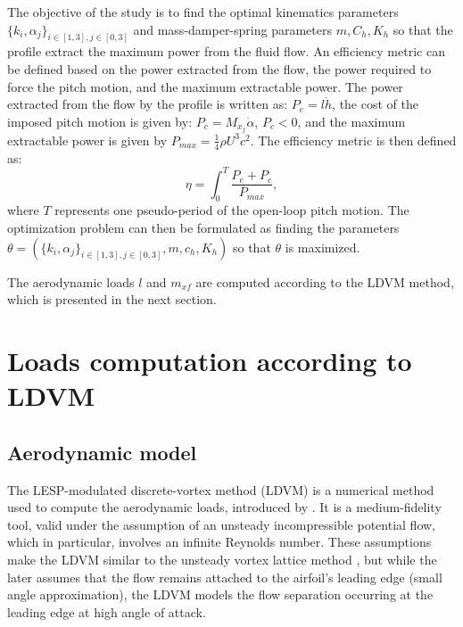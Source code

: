 \documentclass[a4paper,12pt]{article}
\begin{document}
The objective of the study is to find the optimal kinematics parameters $\{k_i,\alpha_j\}_{i\in [1,3], j \in [0,3]}$ and mass-damper-spring parameters $m, C_h, K_h$ so that the profile extract the maximum power from the fluid flow. 
An efficiency metric can be defined based on the power extracted from the flow, the power required to force the pitch motion, and the maximum extractable power.
The power extracted from the flow by the profile is written as:
  $P_{e} =l \dot{h}$, the cost of the imposed pitch motion is given by:  $P_{c} = M_{x_f} \dot{\alpha}$, $P_c<0$, and the maximum extractable power is given by $P_{max} = \frac{1}{4} \rho U^3 c^2 $.
The efficiency metric is then defined as:
\begin{equation}
  \eta = \int_0^T\frac{P_e + P_c}{P_{max}},
\label{eq:efficiency}
\end{equation}
where $T$ represents one pseudo-period of the open-loop pitch motion.
The optimization problem can then be formulated as finding the parameters $\theta = \left(\{k_i,\alpha_j\}_{i\in [1,3], j \in [0,3]},m, c_h, K_h\right)$ so that $\theta$ is maximized.

The aerodynamic loads $l$ and $m_{x f}$ are computed according to the LDVM method, which is presented in the next section.

\section{Loads computation according to LDVM}

\subsection{Aerodynamic model}
The LESP-modulated discrete-vortex method (LDVM) is a numerical method used to compute the aerodynamic loads, introduced by \cite{ramesh2014discrete}. 
It is a medium-fidelity tool, valid under the assumption of an unsteady incompressible potential flow, which in
particular, involves an infinite Reynolds number.
These assumptions make the LDVM similar to the unsteady vortex lattice method \cite{katz_plotkin}, but while the later assumes that the flow remains attached to the airfoil's leading edge (small angle approximation), the LDVM models the flow separation occurring at the leading edge at high angle of attack.  
\end{document}
